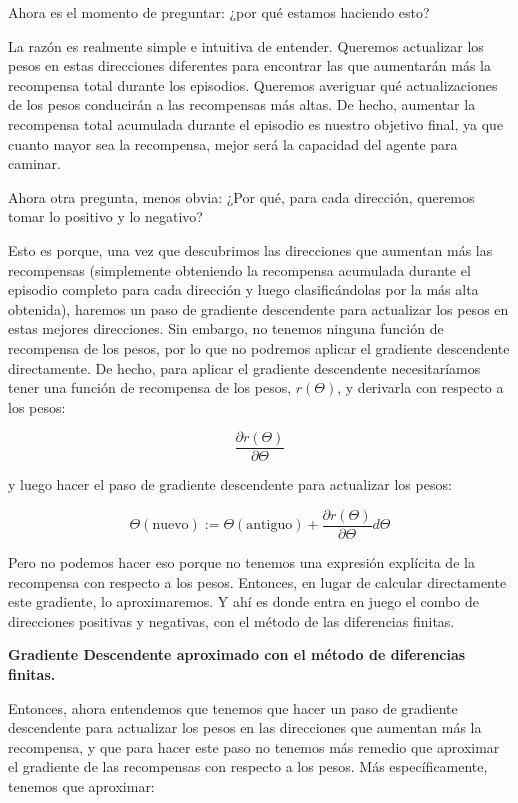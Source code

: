 \documentclass[]{book}
\begin{document}
Ahora es el momento de preguntar: ¿por qué estamos haciendo esto?

La razón es realmente simple e intuitiva de entender. Queremos actualizar los pesos en estas direcciones diferentes para encontrar las que aumentarán más la recompensa total durante los episodios. Queremos averiguar qué actualizaciones de los pesos conducirán a las recompensas más altas. De hecho, aumentar la recompensa total acumulada durante el episodio es nuestro objetivo final, ya que cuanto mayor sea la recompensa, mejor será la capacidad del agente para caminar.

Ahora otra pregunta, menos obvia: ¿Por qué, para cada dirección, queremos tomar lo positivo y lo negativo?

Esto es porque, una vez que descubrimos las direcciones que aumentan más las recompensas (simplemente obteniendo la recompensa acumulada durante el episodio completo para cada dirección y luego clasificándolas por la más alta obtenida), haremos un paso de gradiente descendente para actualizar los pesos en estas mejores direcciones. Sin embargo, no tenemos ninguna función de recompensa de los pesos, por lo que no podremos aplicar el gradiente descendente directamente. De hecho, para aplicar el gradiente descendente necesitaríamos tener una función de recompensa de los pesos, \(r(\Theta)\), y derivarla con respecto a los pesos:

\[\frac{\partial r(\Theta)}{\partial \Theta}\]

y luego hacer el paso de gradiente descendente para actualizar los pesos:

\[\Theta(\textrm{nuevo}) := \Theta(\textrm{antiguo}) + \frac{\partial r(\Theta)}{\partial \Theta} d \Theta\]

Pero no podemos hacer eso porque no tenemos una expresión explícita de la recompensa con respecto a los pesos. Entonces, en lugar de calcular directamente este gradiente, lo aproximaremos. Y ahí es donde entra en juego el combo de direcciones positivas y negativas, con el método de las diferencias finitas.

\textbf{Gradiente Descendente aproximado con el método de diferencias finitas.}

Entonces, ahora entendemos que tenemos que hacer un paso de gradiente descendente para actualizar los pesos en las direcciones que aumentan más la recompensa, y que para hacer este paso no tenemos más remedio que aproximar el gradiente de las recompensas con respecto a los pesos. Más específicamente, tenemos que aproximar:
\end{document}
